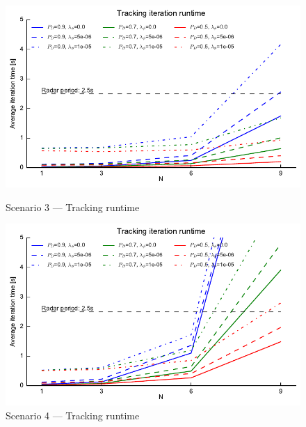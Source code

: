 \begin{figure}
\centering
\includegraphics{Figures/plots/Scenario3_Tracking-Runtime.pdf}
\caption{Scenario 3 --- Tracking runtime}\label{fig:scenario3_tracking_runtime}

\includegraphics{Figures/plots/Scenario4_Tracking-Runtime.pdf}
\caption{Scenario 4 --- Tracking runtime}\label{fig:scenario4_tracking_runtime}
\end{figure}
